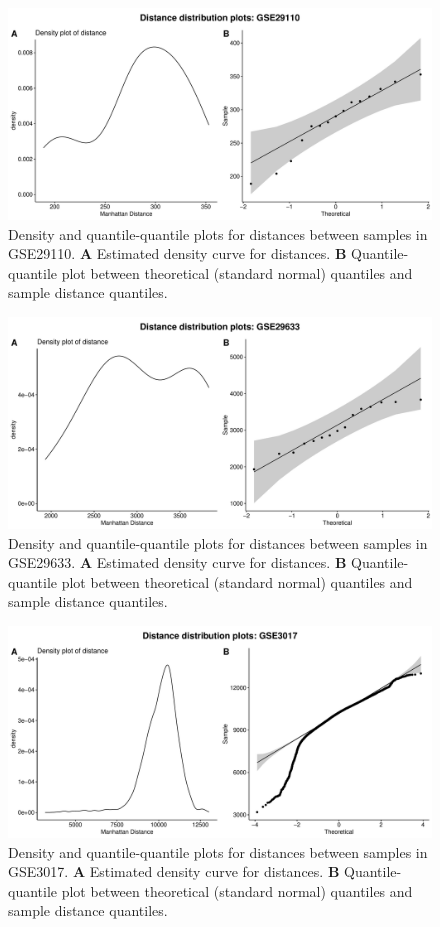 \documentclass[10pt,letterpaper]{article}\usepackage[]{graphicx}\usepackage[]{color}
\begin{document}
\begin{figure}[H]
	\includegraphics[width=\textwidth]{manhattan-distance_hist_GSE29110.pdf}
	\caption{Density and quantile-quantile plots for distances between samples in GSE29110. \textbf{A} Estimated density curve for distances. \textbf{B} Quantile-quantile plot between theoretical (standard normal) quantiles and sample distance quantiles.}
\end{figure}

\begin{figure}[H]
	\includegraphics[width=\textwidth]{manhattan-distance_hist_GSE29633.pdf}
	\caption{Density and quantile-quantile plots for distances between samples in GSE29633. \textbf{A} Estimated density curve for distances. \textbf{B} Quantile-quantile plot between theoretical (standard normal) quantiles and sample distance quantiles.}
\end{figure}

\begin{figure}[H]
	\includegraphics[width=\textwidth]{manhattan-distance_hist_GSE3017.pdf}
	\caption{Density and quantile-quantile plots for distances between samples in GSE3017. \textbf{A} Estimated density curve for distances. \textbf{B} Quantile-quantile plot between theoretical (standard normal) quantiles and sample distance quantiles.}
\end{figure}
\end{document}
